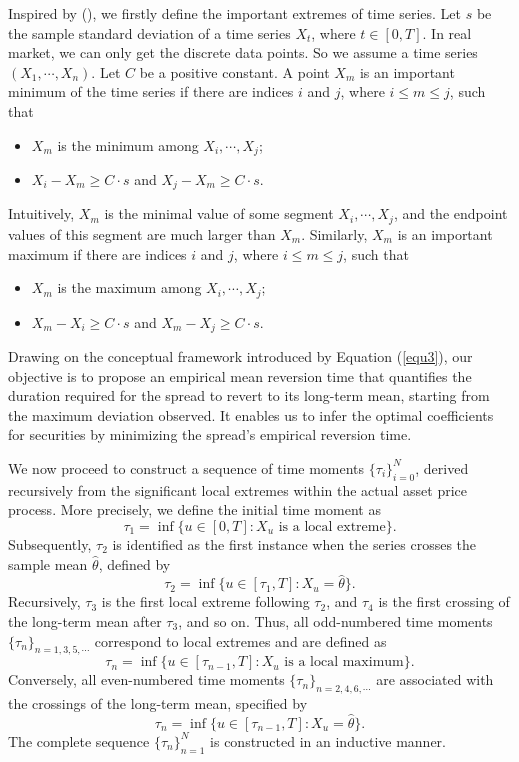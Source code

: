 \documentclass{article}
\begin{document}
Inspired by \citeauthor{fink2007important} (\citeyear{fink2007important}), we firstly define the important extremes of time series. Let $s$ be the sample standard deviation of a time series $X_t$, where $t\in[0, T]$. In real market, we can only get the discrete data points. So we assume a time series $(X_1,\cdots,X_n)$. Let $C$ be a positive constant. A point $X_m$ is an important minimum of the time series if there are indices $i$ and $j$, where $i \leq m \leq j$, such that
\begin{itemize}
    \item $X_m$ is the minimum among $X_i,\cdots,X_j$;
    \item $X_i-X_m \geq C\cdot s$ and $X_j-X_m \geq C\cdot s$.
\end{itemize}
Intuitively, $X_m$ is the minimal value of some segment $X_i,\cdots,X_j$, and the endpoint values of this segment are much larger than $X_m$. Similarly, $X_m$ is an important maximum if there are indices $i$ and $j$, where $i\leq m \leq j$, such that
\begin{itemize}
    \item $X_m$ is the maximum among $X_i,\cdots,X_j$;
    \item $X_m - X_i \geq C\cdot s$ and $X_m-X_j \geq C\cdot s$.
\end{itemize}

Drawing on the conceptual framework introduced by Equation (\ref{equ3}), our objective is to propose an empirical mean reversion time that quantifies the duration required for the spread to revert to its long-term mean, starting from the maximum deviation observed. It enables us to infer the optimal coefficients for securities by minimizing the spread's empirical reversion time.

We now proceed to construct a sequence of time moments \(\{\tau_i\}_{i=0}^{N}\), derived recursively from the significant local extremes within the actual asset price process.
More precisely, we define the initial time moment as
\[
\tau_1 = \inf\{u \in [0, T] : X_u \text{ is a local extreme}\}.
\]
Subsequently, $\tau_2$ is identified as the first instance when the series crosses the sample mean $\hat{\theta}$, defined by
\[
\tau_2 = \inf\{u \in [\tau_1, T] : X_u = \hat{\theta}\}.
\]
Recursively, $\tau_3$ is the first local extreme following $\tau_2$, and $\tau_4$ is the first crossing of the long-term mean after $\tau_3$, and so on. Thus, all odd-numbered time moments $\{\tau_n\}_{n=1,3,5,\cdots}$ correspond to local extremes and are defined as
\[
\tau_n = \inf\{u \in [\tau_{n-1}, T] : X_u \text{ is a local maximum}\}.
\]
Conversely, all even-numbered time moments $\{\tau_n\}_{n=2,4,6,\cdots}$ are associated with the crossings of the long-term mean, specified by
\[
\tau_n = \inf\{u \in [\tau_{n-1}, T] : X_u = \hat{\theta}\}.
\]
The complete sequence $\{\tau_n\}_{n=1}^{N}$ is constructed in an inductive manner.
\end{document}
